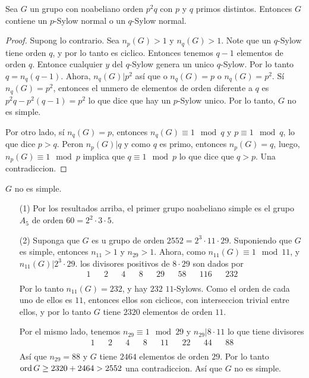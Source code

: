 \begin{lemma}\label{9.42}
    Sea $G$ un grupo con noabeliano orden $p^2q$ con  $p$ y  $q$ primos
    distintos. Entonces $G$ contiene un  $p$-Sylow normal o un $q$-Sylow normal.
\end{lemma}
\begin{proof}
    Supong lo contrario. Sea $n_p(G)>1$ y $n_q(G)>1$. Note que un $q$-Sylow
    tiene orden $q$, y por lo tanto es ciclico. Entonces tenemos  $q-1$
    elementos de orden $q$. Entonce cualquier $y$ del  $q$-Sylow genera un unico
     $q$-Sylow. Por lo tanto  $q=n_q(q-1)$. Ahora, $n_q(G)|p^2$ as\'i que o
     $n_q(G)=p$ o  $n_q(G)=p^2$. S\'i $n_q(G)=p^2$, entonces el unmero de
     elementos de orden diferente a $q$ es  $p^2q-p^2(q-1)=p^2$ lo que dice que
     hay un $p$-Sylow unico. Por lo tanto, $G$ no es simple.

     Por otro lado, s\'i  $n_q(G)=p$, entonces $n_q(G) \equiv 1 \mod{q}$ y $p
     \equiv 1 \mod{q}$, lo que dice $p>q$. Peron  $n_p(G)|q$ y como $q$ es
     primo, entonces $n_p(G)=q$, luego, $n_p(G) \equiv 1 \mod{p}$ implica que $q
     \equiv 1 \mod{p}$ lo que dice que $q>p$.  Una contradiccion.
\end{proof}
\begin{corollary}
    $G$ no es simple.
\end{corollary}

\begin{example}\label{}
    \begin{enumerate}
        \item[(1)] Por los resultados arriba, el primer grupo noabeliano simple
            es el grupo $A_5$ de orden $60=2^2 \cdot 3 \cdot 5$.

        \item[(2)] Suponga que $G$ es u grupo de orden  $2552=2^3 \cdot 11 \cdot
            29$. Suponiendo que  $G$ es simple, entonces  $n_{11}>1$ y
            $n_{29}>1$. Ahora, como $n_{11}(G) \equiv 1 \mod{11}$, y
            $n_{11}(G)|2^3 \cdot 29$. los divisores positivos de $8 \cdot 29$
            son dados por
            \begin{align*}
                1   &&  2   &&  4   &&  8   &&  29  &&  58  &&  116 &&  232 \\
            \end{align*}
            Por lo tanto $n_{11}(G)=232$, y hay $232$  $11$-Sylows. Como el
            orden de cada uno de ellos es  $11$, entonces ellos son ciclicos,
            con interseccion trivial entre ellos, y por lo tanto $G$ tiene
            $2320$ elementos de orden  $11$.

            Por el mismo lado, tenemos  $n_{29} \equiv 1 \mod{29}$ y  $n_{29}|8
            \cdot 11$ lo que tiene divisores
            \begin{align*}
                1   &&  2   &&  4   &&  8   &&  11  &&  22  &&  44  &&  88  \\
            \end{align*}
            As\'i que $n_{29}=88$ y $G$ tiene  $2464$ elementos de orden  $29$.
            Por lo tanto  $\operatorname{ord}{G} \geq 2320+2464>2552$ una contradiccion. As\'i
            que $G$ no es simple.
    \end{enumerate}
\end{example}
